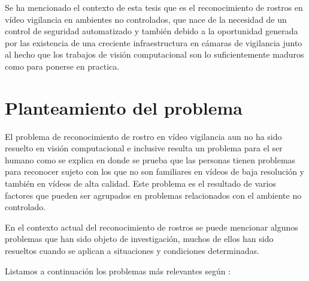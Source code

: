 Se ha mencionado el contexto de esta tesis que es el reconocimiento de rostros en vídeo vigilancia en ambientes no controlados, que nace de la necesidad de un control de seguridad automatizado y también debido a la oportunidad generada por las existencia de una creciente infraestructura en cámaras de vigilancia junto al hecho que los trabajos de visión computacional son lo suficientemente maduros como para ponerse en practica.


\section{Planteamiento del problema}\label{ssc:PlanteamientoProblema}
El problema de reconocimiento de rostro en vídeo vigilancia aun no ha sido resuelto en visión computacional e inclusive resulta un problema para el ser humano como se explica en \citep{burton1999face} donde se prueba que las personas tienen problemas para reconocer sujeto con los que no son familiares en vídeos de baja resolución y también en vídeos de alta calidad.
Este problema es el resultado de varios factores que pueden ser agrupados en problemas relacionados con el ambiente no controlado.

En el contexto actual del reconocimiento de rostros se puede mencionar algunos problemas que han sido objeto de investigación, muchos de ellos han sido resueltos cuando se aplican a situaciones y condiciones determinadas. 

Listamos a continuación  los problemas más relevantes según \citep{gross2001quo}:

